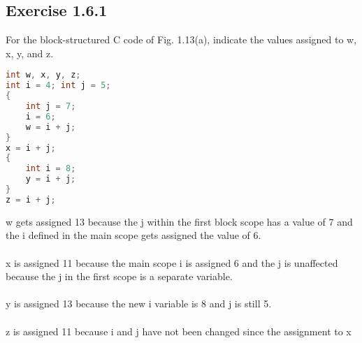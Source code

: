 \documentclass[letterpaper, 10pt, DIV=13]{scrartcl}
\numberwithin{equation}{section}
\numberwithin{figure}{section}
\numberwithin{table}{section}
\begin{document}
\subsection{Exercise 1.6.1}
For the block-structured C code of Fig. 1.13(a), indicate the values assigned to w, x, y, and z.
\begin{lstlisting}[frame=single, language=C]
int w, x, y, z;
int i = 4; int j = 5;
{
    int j = 7;
    i = 6;
    w = i + j;
}
x = i + j;
{
    int i = 8;
    y = i + j;
}
z = i + j;
\end{lstlisting}

w gets assigned 13 because the j within the first block scope has a value of 7 and the i defined in the main scope gets assigned the value of 6.
\\\\
x is assigned 11 because the main scope i is assigned 6 and the j is unaffected because the j in the first scope is a separate variable.
\\\\
y is assigned 13 because the new i variable is 8 and j is still 5.
\\\\
z is assigned 11 because i and j have not been changed since the assignment to x
\end{document}
